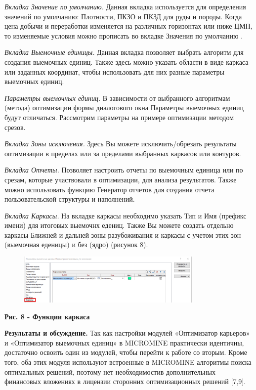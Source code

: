 \emph{Вкладка Значение по умолчанию.} Данная вкладка используется для
определения значений по умолчанию: Плотности, ПКЗО и ПКЗД для руды и
породы. Когда цена добычи и переработки изменяется на различных
горизонтах или ниже ЦМП, то изменяемые условия можно прописать во
вкладке Значения по умолчанию .

\emph{Вкладка Выемочные единицы.} Данная вкладка позволяет выбрать
алгоритм для создания выемочных единиц. Также здесь можно указать
области в виде каркаса или заданных координат, чтобы использовать для
них разные параметры выемочных единиц.

\emph{Параметры выемочных единиц.} В зависимости от выбранного
алгоритмам (метода) оптимизации формы диалогового окна Параметры
выемочных единиц будут отличаться. Рассмотрим параметры на примере
оптимизации методом срезов.

\emph{Вкладка Зоны исключения.} Здесь Вы можете исключить/обрезать
результаты оптимизации в пределах или за пределами выбранных каркасов
или контуров.

\emph{Вкладка Отчеты.} Позволяет настроить отчеты по выемочным единица
или по срезам, которые участвовали в оптимизации, для анализа
результатов. Также можно использовать функцию Генератор отчетов для
создания отчета пользовательской структуры и наполнений.

\emph{Вкладка Каркасы.} На вкладке каркасы необходимо указать Тип и Имя
(префикс имени) для итоговых выемочнх едениц. Также Вы можете создать
отдельно каркасы Ближней и дальней зоны разубоживания и каркасы с учетом
этих зон (выемочная еденицы) и без (ядро) (рисунок 8).

\begin{figure}[H]
	\centering
	\includegraphics[width=0.8\textwidth]{assets/1257}
	\caption*{}
\end{figure}

{\bfseries Рис. 8 - Функции каркаса}

{\bfseries Результаты и обсуждение.} Так как настройки модулей «Оптимизатор
карьеров» и «Оптимизатор выемочных единиц» в MICROMINE практически
идентичны, достаточно освоить один из модулей, чтобы перейти к работе со
вторым. Кроме того, оба этих модуля используют встроенные в MICROMINE
алгоритмы поиска оптимальных решений, поэтому нет необходимостив
дополнительных финансовых вложениях в лицензии сторонних оптимизационных
решений {[}7,9{]}.

